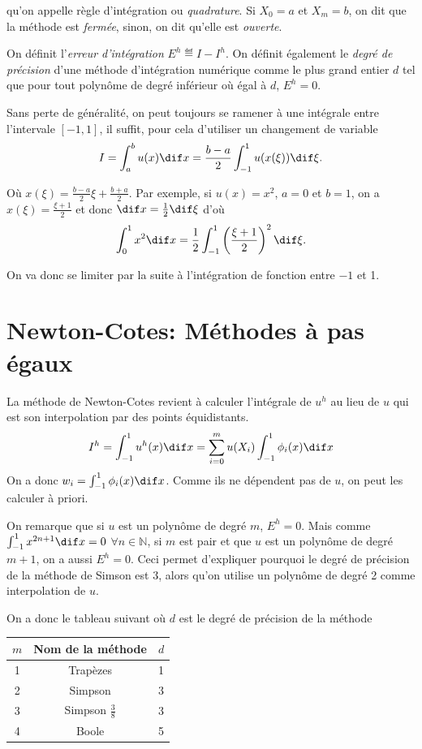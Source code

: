 qu'on appelle règle d'intégration ou \emph{quadrature}.
Si $X_0 = a$ et $X_m = b$, on dit que la méthode est \emph{fermée},
sinon, on dit qu'elle est \emph{ouverte}.

On définit l'\emph{erreur d'intégration} $E^h \eqdef I - I^h$.
On définit également le \emph{degré de précision} d'une méthode d'intégration
numérique comme le plus grand entier $d$ tel que pour tout polynôme de degré
inférieur où égal à $d$, $E^h = 0$.

Sans perte de généralité, on peut toujours se ramener à une intégrale
entre l'intervale $[-1, 1]$, il suffit, pour cela d'utiliser un changement
de variable
\[ I = \int_a^b u(x) \dif x =
\frac{b-a}{2} \int_{-1}^1 u(x(\xi)) \dif \xi. \]

Où $x(\xi) = \frac{b-a}{2}\xi + \frac{b+a}{2}$.
Par exemple, si $u(x) = x^2$, $a = 0$ et $b = 1$,
on a $x(\xi) = \frac{\xi+1}{2}$ et donc $\dif x = \frac{1}{2}\dif \xi$ d'où
\[ \int_0^1 x^2 \dif x =
\frac{1}{2}\int_{-1}^1 \left(\frac{\xi+1}{2}\right)^2 \dif \xi. \]

On va donc se limiter par la suite à l'intégration de fonction entre $-1$ et 1.

\section{Newton-Cotes: Méthodes à pas égaux}
La méthode de Newton-Cotes revient à calculer l'intégrale de $u^h$ au lieu
de $u$ qui est son interpolation par des points équidistants.
\[ I^h = \int_{-1}^1 u^h(x) \dif x =
\sum_{i=0}^m u(X_i) \int_{-1}^1 \phi_i(x) \dif x \]
On a donc $w_i = \int_{-1}^1 \phi_i(x) \dif x$.
Comme ils ne dépendent pas de $u$, on peut les calculer à priori.

On remarque que si $u$ est un polynôme de degré $m$, $E^h = 0$.
Mais comme $\int_{-1}^1 x^{2n+1} \dif x = 0$ $\forall n \in \mathbb{N}$,
si $m$ est pair et que $u$ est un polynôme de degré $m+1$,
on a aussi $E^h = 0$. Ceci permet d'expliquer pourquoi le degré
de précision de la méthode de Simson est 3, alors qu'on utilise
un polynôme de degré 2 comme interpolation de $u$.

On a donc le tableau suivant où $d$ est le degré de précision de la méthode
\begin{center}
  \begin{tabular}{|c|c|c|}
    \hline
    $m$ & Nom de la méthode & $d$\\
    \hline
    1 & Trapèzes & 1\\
    2 & Simpson & 3\\
    3 & Simpson $\frac{3}{8}$ & 3\\
    4 & Boole & 5\\
    \hline
  \end{tabular}
\end{center}

